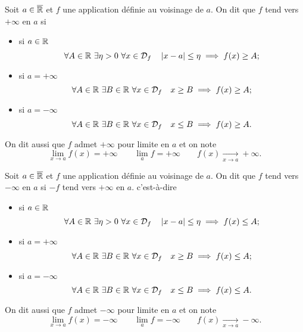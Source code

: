 \begin{defdef}
  Soit $a \in \overline{\mathbb{R}}$ et $f$ une application définie au voisinage de $a$. On dit que $f$ tend vers $+\infty$ en $a$ si
  \begin{itemize}
  \item si $a \in \mathbb{R}$
    \begin{equation}
      \forall A \in \mathbb{R} \ \exists \eta > 0 \ \forall x \in \mathcal{D}_{f} \quad \left\lvert x-a\right\rvert \leq \eta \implies f(x) \geq A;
    \end{equation}
  \item si $a= + \infty$
    \begin{equation}
      \forall A \in \R \ \exists B \in \R \ \forall x \in \Def{f} \quad x \geq B \implies f(x) \geq A;
    \end{equation}
    \item si $a= - \infty$
    \begin{equation}
      \forall A \in \R \ \exists B \in \R \ \forall x \in \Def{f} \quad x \leq B \implies f(x) \geq A.
    \end{equation}
  \end{itemize}
  On dit aussi que $f$ admet $+\infty$ pour limite en $a$ et on note
\begin{equation}
  \lim\limits_{x \to a}f(x)=+\infty \qquad \lim\limits_{a}f=+\infty \qquad f(x) \underset{x \to a}{\longrightarrow} +\infty.
\end{equation}
\end{defdef}
\begin{defdef}
  Soit $a \in \overline{\mathbb{R}}$ et $f$ une application définie au voisinage de $a$. On dit que $f$ tend vers $-\infty$ en $a$ si $-f$ tend vers $+\infty$ en $a$. c'est-à-dire
\begin{itemize}
  \item si $a \in \mathbb{R}$
    \begin{equation}
      \forall A \in \mathbb{R} \ \exists \eta > 0 \ \forall x \in \mathcal{D}_{f} \quad \left\lvert x-a\right\rvert \leq \eta \implies f(x) \leq A;
    \end{equation}
  \item si $a= + \infty$
    \begin{equation}
      \forall A \in \R \ \exists B \in \R \ \forall x \in \Def{f} \quad x \geq B \implies f(x) \leq A;
    \end{equation}
    \item si $a= - \infty$
    \begin{equation}
      \forall A \in \R \ \exists B \in \R \ \forall x \in \Def{f} \quad x \leq B \implies f(x) \leq A.
    \end{equation}
  \end{itemize}
  On dit aussi que $f$ admet $-\infty$ pour limite en $a$ et on note
  \begin{equation}
    \lim\limits_{x \to a}f(x)=-\infty \qquad \lim\limits_{a}f=-\infty \qquad f(x) \underset{x \to a}{\longrightarrow} -\infty.
  \end{equation}
\end{defdef}
